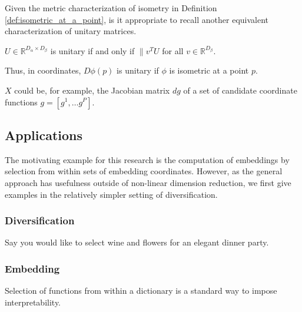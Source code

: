 Given the metric characterization of isometry in Definition \ref{def:isometric_at_a_point}, is it appropriate to recall another equivalent characterization of unitary matrices.
\begin{proposition}
\label{prop:unitary_spectrum}
$U \in \mathbb{R}^{D_\alpha \times D_\beta}$ is unitary if and only if $\| v^T  U$ for all $v \in \mathbb R^{D_\beta}$.
\end{proposition}
Thus, in coordinates, $D \phi (p)$ is unitary if $\phi$ is isometric at a point $p$.

$X$ could be, for example, the Jacobian matrix $d g$ of a set of candidate coordinate functions $g = [g^1, \dotsc g^P]$.


\subsection{Applications}

The motivating example for this research is the computation of embeddings by selection from within sets of embedding coordinates.
However, as the general approach has usefulness outside of non-linear dimension reduction, we first give examples in the relatively simpler setting of diversification.

\subsubsection{Diversification}

Say you would like to select wine and flowers for an elegant dinner party.

\subsubsection{Embedding}

Selection of functions from within a dictionary is a standard way to impose interpretability.





